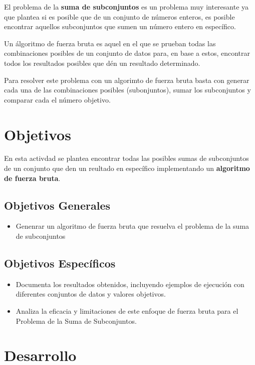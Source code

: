 \documentclass[12pt, a4paper]{article} %
\begin{document}
El problema de la \textbf{suma de subconjuntos} es un problema muy interesante ya que plantea si es posible que de un conjunto de números enteros, es posible encontrar aquellos subconjuntos que sumen un número entero en específico.

Un álgoritmo de fuerza bruta es aquel en el que se prueban todas las combinaciones posibles de un conjunto de datos para, en base a estos, encontrar todos los resultados posibles que dén un resultado determinado.

Para resolver este problema con un algorimto de fuerza bruta basta con generar cada una de las combinaciones posibles (subonjuntos), sumar los subconjuntos y comparar cada el número objetivo.

\section{Objetivos}

En esta activdad se plantea encontrar todas las posibles sumas de subconjuntos de un conjunto que den un reultado en específico implementando un \textbf{algoritmo de fuerza bruta}. 

\subsection{Objetivos Generales}

\begin{itemize}
	\item Genenrar un algoritmo de fuerza bruta que resuelva el problema de la suma de subconjuntos
\end{itemize}

\subsection{Objetivos Específicos}

\begin{itemize}
	\item Documenta los	resultados obtenidos, incluyendo ejemplos de ejecución con
	diferentes conjuntos de datos y valores objetivos.
	\item Analiza la eficacia y limitaciones de este enfoque de fuerza bruta para el
	Problema de la Suma de Subconjuntos.
\end{itemize}

\section{Desarrollo}
\end{document}
